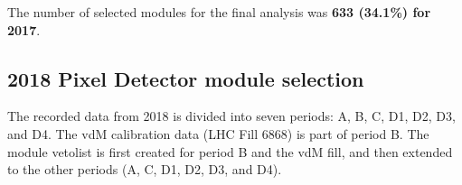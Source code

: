 The number of selected modules for the final analysis was \textbf{633 (34.1\%) for 2017}.


\clearpage \newpage
\subsection{2018 Pixel Detector module selection}
\label{sec:pcc_perf_moduleselection}


The recorded data from 2018 is divided into seven periods: A, B, C, D1, D2, D3, and D4. The vdM calibration data (LHC Fill 6868) is part of period B. The module vetolist is first created for period B and the vdM fill, and then extended to the other periods (A, C, D1, D2, D3, and D4).

